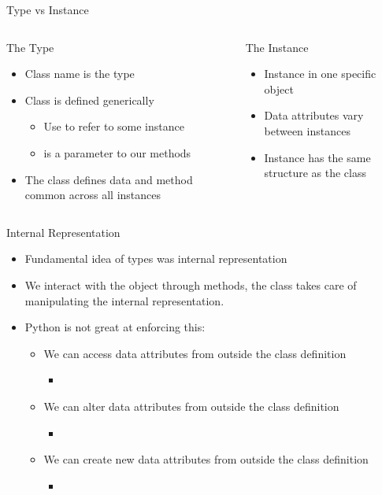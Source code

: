 \documentclass[pdf, aspectratio=169, 12pt]{beamer}
\begin{document}
\begin{frame}{Type vs Instance}
	\begin{columns}[t]
		\begin{block}{The Type}
			\begin{itemize}
				\item Class name is the \alert{type}
				\item Class is defined generically
					\begin{itemize}
						\item Use  to refer to some instance 
						\item {} is a parameter to our methods 
					\end{itemize}
				\item The class defines data and method common across \alert{all} instances
			\end{itemize}
		\end{block}
		\begin{block}{The Instance}
			\begin{itemize}
				\item Instance in one \alert{specific} object
				\item Data attributes vary between instances
				\item Instance has the same structure as the class
			\end{itemize}
		\end{block}
	\end{columns}
\end{frame}

\begin{frame}{Internal Representation}
	\begin{itemize}
		\item Fundamental idea of types was \alert{internal} representation
		\item We interact with the object through methods, the class takes care of manipulating the internal representation.
		\item Python is not great at enforcing this:
			\begin{itemize}[<+->]
				\item We can \alert{access} data attributes from outside the class definition
					\begin{itemize}
						\item {}
					\end{itemize}
				\item We can \alert{alter} data attributes from outside the class definition
					\begin{itemize}
						\item {}
					\end{itemize}
				\item We can \alert{create new} data attributes from outside the class definition
					\begin{itemize}
						\item {}
					\end{itemize}
			\end{itemize}
	\end{itemize}
\end{frame}
\end{document}
